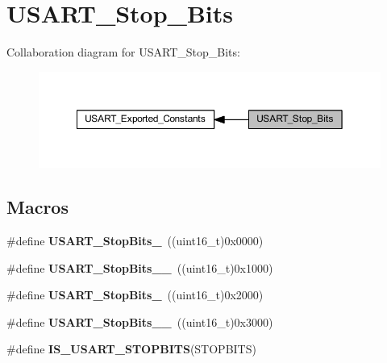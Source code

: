 \hypertarget{group___u_s_a_r_t___stop___bits}{}\section{U\+S\+A\+R\+T\+\_\+\+Stop\+\_\+\+Bits}
\label{group___u_s_a_r_t___stop___bits}
Collaboration diagram for U\+S\+A\+R\+T\+\_\+\+Stop\+\_\+\+Bits\+:\nopagebreak
\begin{figure}[H]
\begin{center}
\leavevmode
\includegraphics[width=350pt]{group___u_s_a_r_t___stop___bits}
\end{center}
\end{figure}
\subsection*{Macros}
\begin{DoxyCompactItemize}
\item 
\mbox{\label{group___u_s_a_r_t___stop___bits_gae2cb35620ba001f0d63e9e0be93e4a05}} 
\#define {\bfseries U\+S\+A\+R\+T\+\_\+\+Stop\+Bits\+\_}~((uint16\+\_\+t)0x0000)
\item 
\mbox{\label{group___u_s_a_r_t___stop___bits_ga2ad06e3acfb691735d05ab9a314e2e32}} 
\#define {\bfseries U\+S\+A\+R\+T\+\_\+\+Stop\+Bits\+\_\+\_}~((uint16\+\_\+t)0x1000)
\item 
\mbox{\label{group___u_s_a_r_t___stop___bits_ga652058b6be2f48ac0d82d0e75537fc81}} 
\#define {\bfseries U\+S\+A\+R\+T\+\_\+\+Stop\+Bits\+\_}~((uint16\+\_\+t)0x2000)
\item 
\mbox{\label{group___u_s_a_r_t___stop___bits_ga30897cc46d5b3790a9b14ffaba354527}} 
\#define {\bfseries U\+S\+A\+R\+T\+\_\+\+Stop\+Bits\+\_\+\_}~((uint16\+\_\+t)0x3000)
\item 
\#define {\bfseries I\+S\+\_\+\+U\+S\+A\+R\+T\+\_\+\+S\+T\+O\+P\+B\+I\+TS}(S\+T\+O\+P\+B\+I\+TS)
\end{DoxyCompactItemize}


